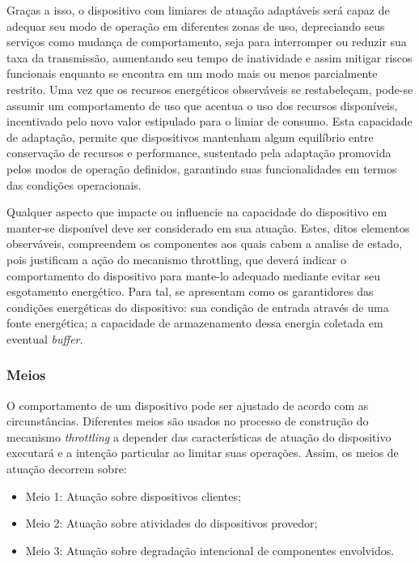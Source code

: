 Graças a isso, o dispositivo com limiares de atuação adaptáveis será capaz de adequar seu modo de operação em diferentes zonas de uso, depreciando seus serviços como mudança de comportamento, seja para interromper ou reduzir sua taxa da transmissão, aumentando seu tempo de inatividade e assim mitigar riscos funcionais enquanto se encontra em um modo mais ou menos parcialmente restrito. Uma vez que os recursos energéticos observáveis se restabeleçam, pode-se assumir um comportamento de uso que acentua o uso dos recursos disponíveis, incentivado pelo novo valor estipulado para o limiar de consumo. Esta capacidade de adaptação, permite que dispositivos mantenham algum equilíbrio entre conservação de recursos e performance, sustentado pela adaptação promovida pelos modos de operação definidos, garantindo suas funcionalidades em termos das condições operacionais.


Qualquer aspecto que impacte ou influencie na capacidade do dispositivo em manter-se disponível deve ser considerado em sua atuação. Estes, ditos elementos observáveis, compreendem os componentes aos quais cabem a analise de estado, pois justificam a ação do mecanismo throttling, que deverá indicar o comportamento do dispositivo para mante-lo adequado mediante evitar seu esgotamento energético. Para tal, se apresentam como os garantidores das condições energéticas do dispositivo: sua condição de entrada através de uma fonte energética; a capacidade de armazenamento dessa energia coletada em eventual \textit{buffer}. 

\subsubsection{Meios}
\label{cap4:atuacao_meios}
O comportamento de um dispositivo pode ser ajustado de acordo com as circunstâncias. Diferentes meios são usados no processo de construção do mecanismo \textit{throttling} a depender das características de atuação do dispositivo executará e a intenção particular ao limitar suas operações. Assim, os meios de atuação decorrem sobre:

\begin{itemize}
	\item Meio 1: Atuação sobre dispositivos clientes; 
	\item Meio 2:\label{meio2} Atuação sobre atividades do dispositivos provedor;
	\item Meio 3:\label{meio3} Atuação sobre degradação intencional de componentes envolvidos.
\end{itemize}

